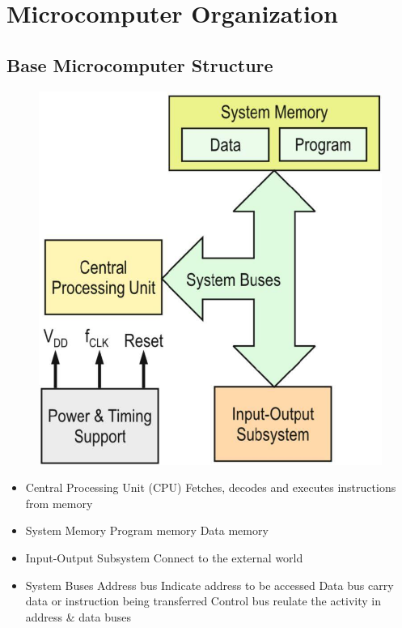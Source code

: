 \section{Microcomputer Organization}
\subsection{Base Microcomputer Structure}

    \begin{figure}%
        \vspace{-1cm}
        \includegraphics[width=\linewidth]{images/uCArchitecture}  
    \end{figure}
    
\begin{itemize}
    \item Central Processing Unit (CPU)
        \subitem Fetches, decodes and executes instructions from memory
    \item System Memory
        \subitem Program memory
        \subitem Data memory 
    \item Input-Output Subsystem
        \subitem Connect to the external world
    \item System Buses 
        \subitem Address bus
            \subsubitem Indicate address to be accessed
        \subitem Data bus
            \subsubitem carry data or instruction being transferred
        \subitem Control bus 
            \subsubitem reulate the activity in address \& data buses 
\end{itemize}
